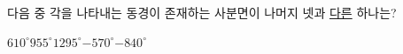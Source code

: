 다음 중 각을 나타내는 동경이 존재하는 사분면이 나머지 넷과 \underline{다른} 하나는?
\begin{choices32}{$610^\circ$}{$955^\circ$}{$1295^\circ$}{$-570^\circ$}{$-840^\circ$}\end{choices32}
